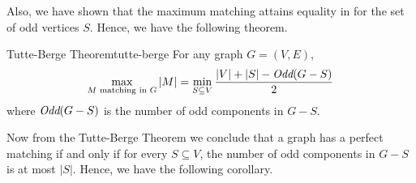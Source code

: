 Also, we have shown that the maximum matching attains equality in  for the set of odd vertices $S$. Hence, we have the following theorem.
\begin{Theorem}{Tutte-Berge Theorem}{tutte-berge}
	For any graph $G=(V,E)$, $$\max\limits_{M\text{ matching in }G}|M|=\min\limits_{S\subseteq V}\frac{|V|+|S|-\emph{Odd}(G-S)}2$$
	where $\emph{Odd}(G-S)$ is the number of odd components in $G-S$.
\end{Theorem}
Now from the Tutte-Berge Theorem we conclude that a graph has a perfect matching if and only if for every $S\subseteq V$, the number of odd components in $G-S$ is at most $|S|$. Hence, we have the following corollary.
